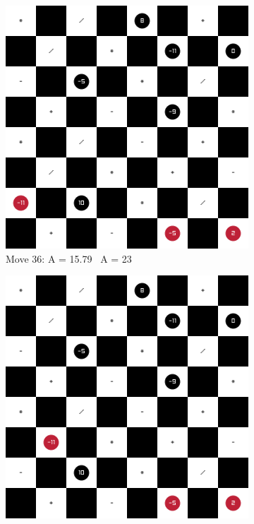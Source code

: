 \begin{figure}[H]
    \centering
    \begin{subfigure}{0.3\textwidth}
        \centering
        \includegraphics[width=\textwidth]{images/games/game6/move_36.png}
        \caption*{Move 36: A = 15.79 \textbar\ A = 23}
    \end{subfigure}
    \quad
    \begin{subfigure}{0.3\textwidth}
        \centering
        \includegraphics[width=\textwidth]{images/games/game6/move_37.png}

\end{subfigure}
\end{figure}
